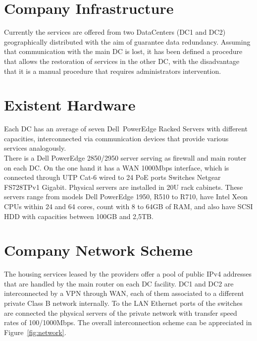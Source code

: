 \documentclass[a4paper, 12pt]{book}
\begin{document}
\section{Company Infrastructure}
\label{sec:infrastructure}

Currently the services are offered from two DataCenters (DC1 and DC2) geographically distributed with the aim of guarantee data redundancy. Assuming that communication with the main DC is lost, it has been defined a procedure that allows the restoration of services in the other DC, with the disadvantage that it is a manual procedure that requires administrators intervention.

\section{Existent Hardware}
\label{sec:hardware}

Each DC has an average of seven Dell\texttrademark \ PowerEdge Racked Servers with different capacities, interconnected via communication devices that provide various services analogously.\\

\noindent There is a Dell PowerEdge 2850/2950 server serving as firewall and main router on each DC. On the one hand it has a WAN 1000Mbps interface, which is connected through UTP Cat-6 wired to 24 PoE ports Switches Netgear FS728TPv1 Gigabit. Physical servers are installed in 20U rack cabinets. These servers range from models Dell PowerEdge 1950, R510 to R710, have Intel Xeon CPUs within 24 and 64 cores, count with 8 to 64GB of RAM, and also have SCSI HDD with capacities between 100GB and 2,5TB.

\section{Company Network Scheme}
\label{sec:network}

The housing services leased by the providers offer a pool of public IPv4 addresses that are handled by the main router on each DC facility. DC1 and DC2 are interconnected by a VPN through WAN, each of them associated to a different private Class B network internally. To the LAN Ethernet ports of the switches are connected the physical servers of the private network with transfer speed rates of 100/1000Mbps. The overall interconnection scheme can be appreciated in Figure~\ref{fig:network}.
\end{document}
